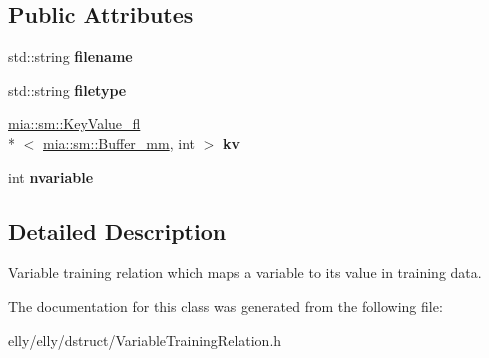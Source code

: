 \subsection*{Public Attributes}
\begin{DoxyCompactItemize}
\item 
\hypertarget{classmia_1_1elly_1_1dstruct_1_1_variable_training_relation_a21a386fd538d32997490bfdfaf16e89c}{std\-::string {\bfseries filename}}\label{classmia_1_1elly_1_1dstruct_1_1_variable_training_relation_a21a386fd538d32997490bfdfaf16e89c}

\item 
\hypertarget{classmia_1_1elly_1_1dstruct_1_1_variable_training_relation_a9a73ac31be32e3f0cc18785c841e78c1}{std\-::string {\bfseries filetype}}\label{classmia_1_1elly_1_1dstruct_1_1_variable_training_relation_a9a73ac31be32e3f0cc18785c841e78c1}

\item 
\hypertarget{classmia_1_1elly_1_1dstruct_1_1_variable_training_relation_a6fedab9df8fe190eb7122cf06f541dab}{\hyperlink{classmia_1_1sm_1_1_key_value__fl}{mia\-::sm\-::\-Key\-Value\-\_\-fl}\\*
$<$ \hyperlink{classmia_1_1sm_1_1_buffer__mm}{mia\-::sm\-::\-Buffer\-\_\-mm}, int $>$ {\bfseries kv}}\label{classmia_1_1elly_1_1dstruct_1_1_variable_training_relation_a6fedab9df8fe190eb7122cf06f541dab}

\item 
\hypertarget{classmia_1_1elly_1_1dstruct_1_1_variable_training_relation_ac651af7167f73bfbc51fa6c940562d52}{int {\bfseries nvariable}}\label{classmia_1_1elly_1_1dstruct_1_1_variable_training_relation_ac651af7167f73bfbc51fa6c940562d52}

\end{DoxyCompactItemize}


\subsection{Detailed Description}
Variable training relation which maps a variable to its value in training data. 

The documentation for this class was generated from the following file\-:\begin{DoxyCompactItemize}
\item 
elly/elly/dstruct/Variable\-Training\-Relation.\-h\end{DoxyCompactItemize}
